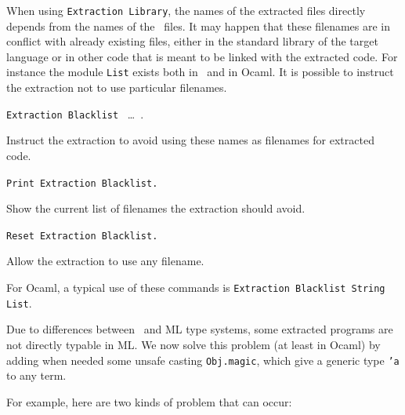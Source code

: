 
When using {\tt Extraction Library}, the names of the extracted files
directly depends from the names of the \Coq\ files. It may happen that
these filenames are in conflict with already existing files, 
either in the standard library of the target language or in other
code that is meant to be linked with the extracted code. 
For instance the module {\tt List} exists both in \Coq\ and in Ocaml.
It is possible to instruct the extraction not to use particular filenames.

\begin{description}
\item{\tt Extraction Blacklist} \ident\ \dots\ \ident. ~\par
  Instruct the extraction to avoid using these names as filenames
  for extracted code. 
\item{\tt Print Extraction Blacklist.} ~\par
  Show the current list of filenames the extraction should avoid.
\item{\tt Reset Extraction Blacklist.} ~\par
  Allow the extraction to use any filename.
\end{description}

For Ocaml, a typical use of these commands is
{\tt Extraction Blacklist String List}.



Due to differences between \Coq\ and ML type systems, 
some extracted programs are not directly typable in ML. 
We now solve this problem (at least in Ocaml) by adding 
when needed some unsafe casting {\tt Obj.magic}, which give
a generic type {\tt 'a} to any term.

For example, here are two kinds of problem that can occur:

